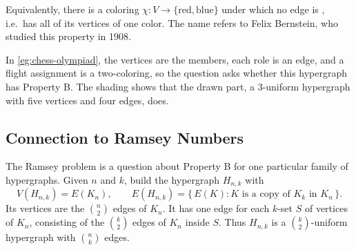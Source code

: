 \begin{center}
\end{center}
Equivalently, there is a coloring \(\chi \colon V \to \{\text{red}, \text{blue}\}\) under which no edge is , i.e.\ has all of its vertices of one color. The name refers to Felix Bernstein, who studied this property in 1908.

In \autoref{eg:chess-olympiad}, the vertices are the members, each role is an edge, and a flight assignment is a two-coloring, so the question asks whether this hypergraph has Property B. The shading shows that the drawn part, a \(3\)-uniform hypergraph with five vertices and four edges, does.

\subsection{Connection to Ramsey Numbers}

The Ramsey problem is a question about Property B for one particular family of hypergraphs. Given \(n\) and \(k\), build the hypergraph \(H_{n,k}\) with
\[
    V(H_{n,k}) = E(K_n), \qquad E(H_{n,k}) = \{\, E(K) : K \text{ is a copy of } K_k \text{ in } K_n \,\}.
\]
Its vertices are the \(\binom{n}{2}\) edges of \(K_n\). It has one edge for each \(k\)-set \(S\) of vertices of \(K_n\), consisting of the \(\binom{k}{2}\) edges of \(K_n\) inside \(S\). Thus \(H_{n,k}\) is a \(\binom{k}{2}\)-uniform hypergraph with \(\binom{n}{k}\) edges.

